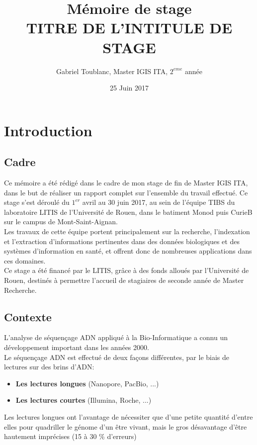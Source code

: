\documentclass{report}
\title{Mémoire de stage\\
TITRE DE L'INTITULE DE STAGE}
\author{Gabriel Toublanc, Master IGIS ITA, $2^{eme}$ année}
\date{25 Juin 2017}
\begin{document}
  \LinesNumbered
  \maketitle\newpage
  \tableofcontents\newpage
  \large
  \chapter*{Introduction}
    \section*{Cadre}
      Ce mémoire a été rédigé dans le cadre de mon stage de fin de Master IGIS ITA, dans le but de réaliser un rapport complet sur l'ensemble du travail effectué. Ce stage s'est déroulé du $1^{er}$ avril au 30 juin 2017, au sein de l'équipe TIBS du laboratoire LITIS de l'Université de Rouen, dans le batiment Monod puis CurieB sur le campus de Mont-Saint-Aignan.\\

      Les travaux de cette équipe portent principalement sur la recherche, l’indexation et l’extraction d’informations pertinentes dans des données biologiques et des systèmes d’information en santé, et offrent donc de nombreuses applications dans ces domaines.\\

      Ce stage a été financé par le LITIS, grâce à des fonds alloués par l’Université de Rouen, destinés à permettre l’accueil de stagiaires de seconde année de Master Recherche.
    \section*{Contexte}
      L'analyse de séquençage ADN appliqué à la Bio-Informatique a connu un développement important dans les années 2000.\\
      Le séquençage ADN est effectué de deux façons différentes, par le biais de lectures sur des brins d'ADN:\\
      \begin{itemize}
        \item \textbf{Les lectures longues} (Nanopore, PacBio, ...)
        \item \textbf{Les lectures courtes} (Illumina, Roche, ...)
      \end{itemize}\bigskip

      Les lectures longues ont l'avantage de nécessiter que d'une petite quantité d'entre elles pour quadriller le génome d'un être vivant, mais le gros désavantage d'être hautement imprécises (15 à 30 \% d'erreurs)\\
\end{document}
